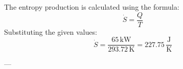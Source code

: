The entropy production is calculated using the formula:  
\[
\dot{S} = \frac{Q}{T}
\]  
Substituting the given values:  
\[
\dot{S} = \frac{65 \, \text{kW}}{293.72 \, \text{K}} = 227.75 \, \frac{\text{J}}{\text{K}}
\]  

---